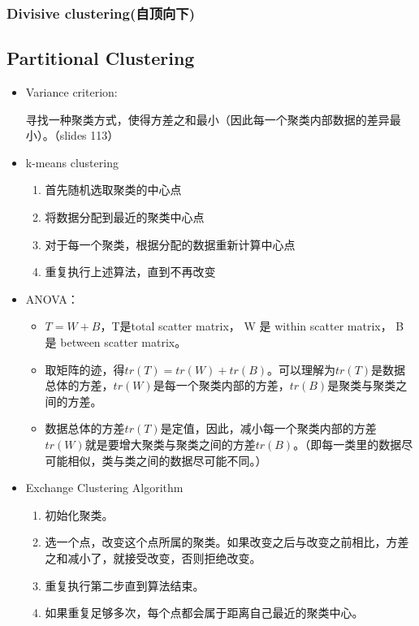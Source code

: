 \documentclass[12pt, a4paper, oneside]{ctexart}
\begin{document}
\subsubsection{Divisive clustering(自顶向下)}
\subsection{Partitional Clustering}
\begin{itemize}
    \item Variance criterion: 
    
    寻找一种聚类方式，使得方差之和最小（因此每一个聚类内部数据的差异最小）。（slides 113）
    \item k-means clustering
    
    \begin{enumerate}
        \item 首先随机选取聚类的中心点
        \item 将数据分配到最近的聚类中心点
        \item 对于每一个聚类，根据分配的数据重新计算中心点
        \item 重复执行上述算法，直到不再改变
    \end{enumerate}
    \item ANOVA：
    
    \begin{itemize}
        \item $T=W+B$，T是total scatter matrix， W 是 within scatter matrix， B 是 between scatter matrix。
        \item 取矩阵的迹，得$tr(T)=tr(W)+tr(B)$。可以理解为$tr(T)$是数据总体的方差，$tr(W)$是每一个聚类内部的方差，$tr(B)$是聚类与聚类之间的方差。
        \item 数据总体的方差$tr(T)$是定值，因此，减小每一个聚类内部的方差$tr(W)$就是要增大聚类与聚类之间的方差$tr(B)$。（即每一类里的数据尽可能相似，类与类之间的数据尽可能不同。）
    \end{itemize}

    \item Exchange Clustering Algorithm
    
    \begin{enumerate}
        \item 初始化聚类。
        \item 选一个点，改变这个点所属的聚类。如果改变之后与改变之前相比，方差之和减小了，就接受改变，否则拒绝改变。
        \item 重复执行第二步直到算法结束。
        \item 如果重复足够多次，每个点都会属于距离自己最近的聚类中心。
    \end{enumerate}
\end{itemize}
\end{document}
